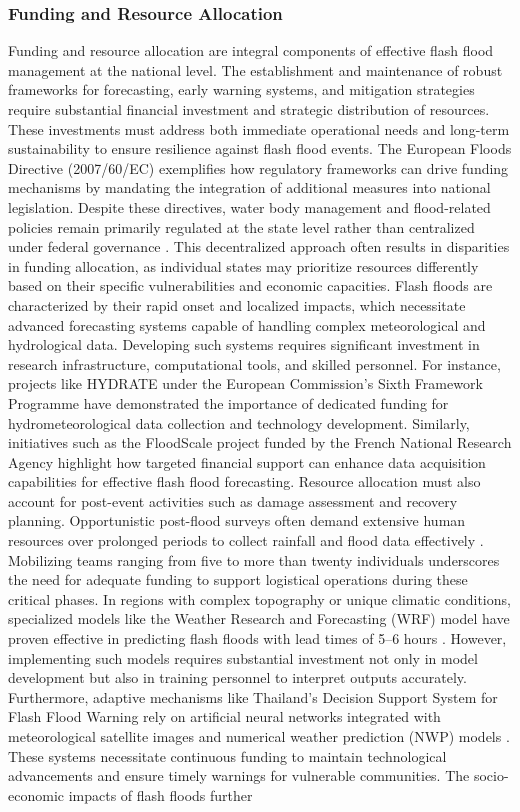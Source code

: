 \subsubsection{Funding and Resource Allocation}
Funding and resource allocation are integral components of effective flash flood management at the national level. The establishment and maintenance of robust frameworks for forecasting, early warning systems, and mitigation strategies require substantial financial investment and strategic distribution of resources. These investments must address both immediate operational needs and long-term sustainability to ensure resilience against flash flood events. The European Floods Directive (2007/60/EC) exemplifies how regulatory frameworks can drive funding mechanisms by mandating the integration of additional measures into national legislation. Despite these directives, water body management and flood-related policies remain primarily regulated at the state level rather than centralized under federal governance \citep{Laudan2020}. This decentralized approach often results in disparities in funding allocation, as individual states may prioritize resources differently based on their specific vulnerabilities and economic capacities. Flash floods are characterized by their rapid onset and localized impacts, which necessitate advanced forecasting systems capable of handling complex meteorological and hydrological data. Developing such systems requires significant investment in research infrastructure, computational tools, and skilled personnel. For instance, projects like HYDRATE under the European Commission's Sixth Framework Programme have demonstrated the importance of dedicated funding for hydrometeorological data collection and technology development. Similarly, initiatives such as the FloodScale project funded by the French National Research Agency highlight how targeted financial support can enhance data acquisition capabilities for effective flash flood forecasting. Resource allocation must also account for post-event activities such as damage assessment and recovery planning. Opportunistic post-flood surveys often demand extensive human resources over prolonged periods to collect rainfall and flood data effectively \citep{Amponsah2018}. Mobilizing teams ranging from five to more than twenty individuals underscores the need for adequate funding to support logistical operations during these critical phases. In regions with complex topography or unique climatic conditions, specialized models like the Weather Research and Forecasting (WRF) model have proven effective in predicting flash floods with lead times of 5–6 hours \citep{AlRawas2024}. However, implementing such models requires substantial investment not only in model development but also in training personnel to interpret outputs accurately. Furthermore, adaptive mechanisms like Thailand's Decision Support System for Flash Flood Warning rely on artificial neural networks integrated with meteorological satellite images and numerical weather prediction (NWP) models \citep{Msigwa2024}. These systems necessitate continuous funding to maintain technological advancements and ensure timely warnings for vulnerable communities. The socio-economic impacts of flash floods further 